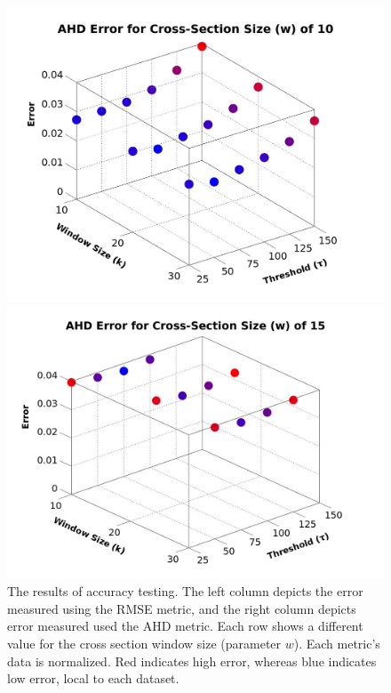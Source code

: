 \begin{figure}
\begin{center}
\begin{minipage} {0.49\linewidth}
    \includegraphics[height=0.25\textheight,width=0.99\linewidth]{images/AHD_Graph_CS10.jpg}

    \includegraphics[height=0.25\textheight,width=0.99\linewidth]{images/AHD_Graph_CS15.jpg}
  \end{minipage}
\end{center}
\caption[The results for the concept tests for the drill operator]{\label{figure:results} The results of accuracy testing. The left column depicts the error measured using the RMSE metric, and the right column depicts error measured used the AHD metric. Each row shows a different value for the cross section window size (parameter $w$). Each metric's data is normalized. Red indicates high error, whereas blue indicates low error, local to each dataset.
}
\end{figure}



